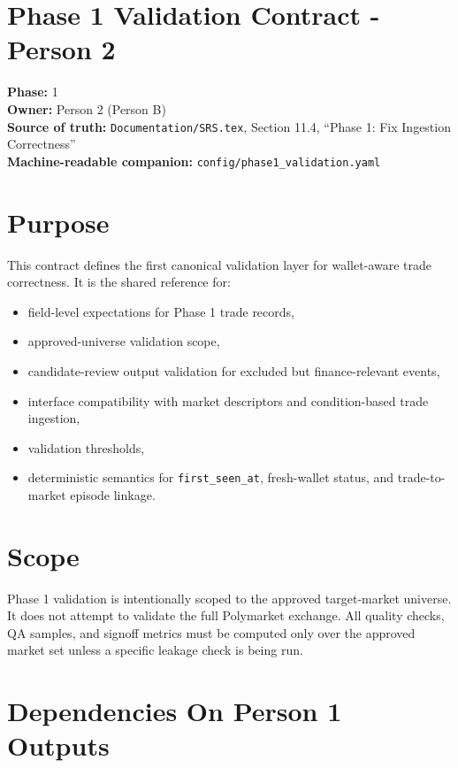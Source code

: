 \documentclass{article}
\begin{document}
\section*{Phase 1 Validation Contract - Person 2}

\textbf{Phase:} 1\\
\textbf{Owner:} Person 2 (Person B)\\
\textbf{Source of truth:} \texttt{Documentation/SRS.tex}, Section 11.4, ``Phase 1: Fix Ingestion Correctness''\\
\textbf{Machine-readable companion:} \texttt{config/phase1\_validation.yaml}

\section*{Purpose}

This contract defines the first canonical validation layer for wallet-aware
trade correctness. It is the shared reference for:
\begin{itemize}
\item field-level expectations for Phase 1 trade records,
\item approved-universe validation scope,
\item candidate-review output validation for excluded but finance-relevant
events,
\item interface compatibility with market descriptors and condition-based trade
ingestion,
\item validation thresholds,
\item deterministic semantics for \texttt{first\_seen\_at}, fresh-wallet status,
and trade-to-market episode linkage.
\end{itemize}

\section*{Scope}

Phase 1 validation is intentionally scoped to the approved target-market
universe. It does not attempt to validate the full Polymarket exchange.
All quality checks, QA samples, and signoff metrics must be computed only over
the approved market set unless a specific leakage check is being run.

\section*{Dependencies On Person 1 Outputs}
\end{document}
